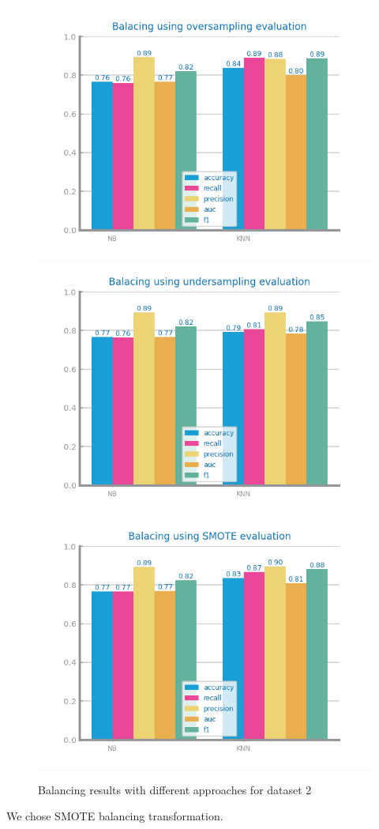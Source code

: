 \documentclass[10pt]{extarticle}
\begin{document}
\begin{figure}[H]
\centering\includegraphics[scale=0.80]{images/dataset2/data_preparation/Credit_Score_balancing_oversampling.png}
\includegraphics[scale=0.80]{images/dataset2/data_preparation/Credit_Score_balancing_undersampling.png}
\includegraphics[scale=0.80]{images/dataset2/data_preparation/Credit_Score_balancing_SMOTE.png}
\caption{Balancing results with different approaches for dataset 2}
\end{figure}
We chose SMOTE balancing transformation.
\end{document}
